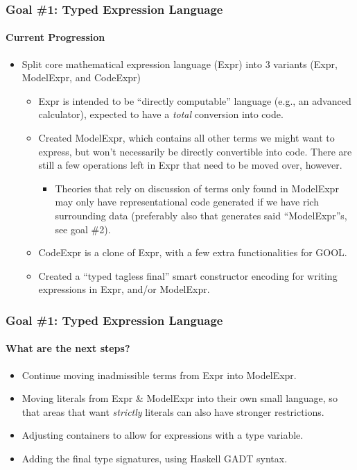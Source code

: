 \documentclass{beamer}
\begin{document}
\begin{frame}
    \frametitle{Goal \#1: Typed Expression Language}
    \framesubtitle{Current Progression}
    
    \begin{itemize}
        \item<2-> Split core mathematical expression language (Expr) into 3 variants (Expr, ModelExpr, and CodeExpr)
            \begin{itemize}
                \item<3-> Expr is intended to be ``directly computable'' language (e.g., an advanced calculator), expected to have a \emph{total} conversion into code.
                \item<4-> Created ModelExpr, which contains all other terms we might want to express, but won't necessarily be directly convertible into code. There are still a few operations left in Expr that need to be moved over, however.
                    \begin{itemize}
                        \item<5-> Theories that rely on discussion of terms only found in ModelExpr may only have representational code generated if we have rich surrounding data (preferably also that generates said ``ModelExpr''s, see goal \#2).
                    \end{itemize}
                \item<6-> CodeExpr is a clone of Expr, with a few extra functionalities for GOOL.
                \item<7-> Created a ``typed tagless final'' \cite{Carette2009finally} smart constructor encoding for writing expressions in Expr, and/or ModelExpr.
            \end{itemize}
    \end{itemize}
\end{frame}

\begin{frame}
    \frametitle{Goal \#1: Typed Expression Language}
    \framesubtitle{What are the next steps?}
    
    \begin{itemize}
        \item<2-> Continue moving inadmissible terms from Expr into ModelExpr.
        \item<3-> Moving literals from Expr \& ModelExpr into their own small language, so that areas that want \emph{strictly} literals can also have stronger restrictions.
        \item<4-> Adjusting containers to allow for expressions with a type variable.
        \item<5-> Adding the final type signatures, using Haskell GADT syntax.
    \end{itemize}
\end{frame}
\end{document}

